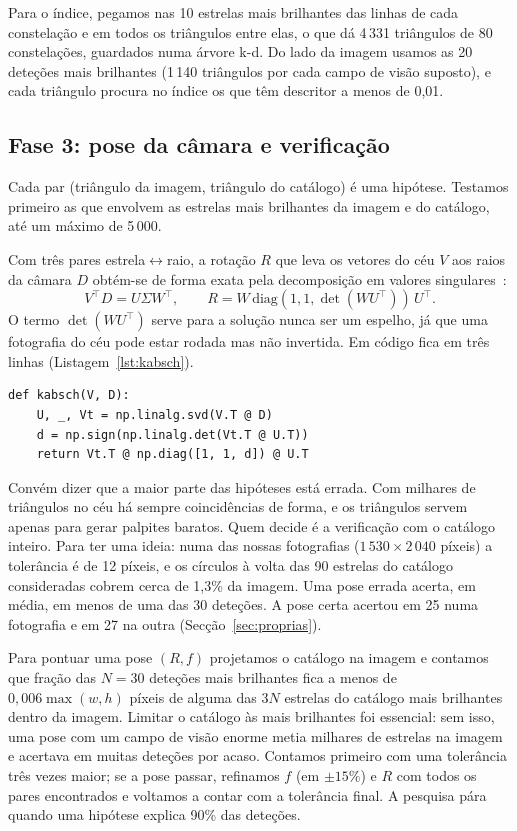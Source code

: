 \documentclass[11pt,a4paper]{article}
\begin{document}
Para o índice, pegamos nas 10 estrelas mais brilhantes das linhas de cada
constelação e em todos os triângulos entre elas, o que dá 4\,331 triângulos
de 80 constelações, guardados numa árvore k-d. Do lado da imagem usamos as 20
deteções mais brilhantes (1\,140 triângulos por cada campo de visão suposto),
e cada triângulo procura no índice os que têm descritor a menos de 0,01.

\subsection{Fase 3: pose da câmara e verificação}

Cada par (triângulo da imagem, triângulo do catálogo) é uma hipótese.
Testamos primeiro as que envolvem as estrelas mais brilhantes da imagem e do
catálogo, até um máximo de 5\,000.

Com três pares estrela$\leftrightarrow$raio, a rotação $R$ que leva os
vetores do céu $V$ aos raios da câmara $D$ obtém-se de forma exata pela
decomposição em valores singulares~\cite{kabsch1976}:
\begin{equation}
  V^\top D = U \Sigma W^\top, \qquad
  R = W\,\mathrm{diag}(1, 1, \det(W U^\top))\,U^\top .
\end{equation}
O termo $\det(WU^\top)$ serve para a solução nunca ser um espelho, já que uma
fotografia do céu pode estar rodada mas não invertida. Em código fica em
três linhas (Listagem~\ref{lst:kabsch}).

\begin{lstlisting}[caption={Rotação de Kabsch (\texttt{src/matching\_sphere.py}).},label=lst:kabsch]
def kabsch(V, D):
    U, _, Vt = np.linalg.svd(V.T @ D)
    d = np.sign(np.linalg.det(Vt.T @ U.T))
    return Vt.T @ np.diag([1, 1, d]) @ U.T
\end{lstlisting}

Convém dizer que a maior parte das hipóteses está errada. Com milhares de
triângulos no céu há sempre coincidências de forma, e os triângulos servem
apenas para gerar palpites baratos. Quem decide é a verificação com o
catálogo inteiro. Para ter uma ideia: numa das nossas fotografias
($1\,530\times2\,040$ píxeis) a tolerância é de 12 píxeis, e os círculos à
volta das 90 estrelas do catálogo consideradas cobrem cerca de 1,3\% da
imagem. Uma pose errada acerta, em média, em menos de uma das 30 deteções. A
pose certa acertou em 25 numa fotografia e em 27 na outra
(Secção~\ref{sec:proprias}).

Para pontuar uma pose $(R, f)$ projetamos o catálogo na imagem e contamos que
fração das $N=30$ deteções mais brilhantes fica a menos de $0{,}006\max(w,h)$
píxeis de alguma das $3N$ estrelas do catálogo mais brilhantes dentro da
imagem. Limitar o catálogo às mais brilhantes foi essencial: sem isso, uma
pose com um campo de visão enorme metia milhares de estrelas na imagem e
acertava em muitas deteções por acaso. Contamos primeiro com uma tolerância
três vezes maior; se a pose passar, refinamos $f$ (em $\pm15\%$) e $R$ com
todos os pares encontrados e voltamos a contar com a tolerância final. A
pesquisa pára quando uma hipótese explica 90\% das deteções.
\end{document}
